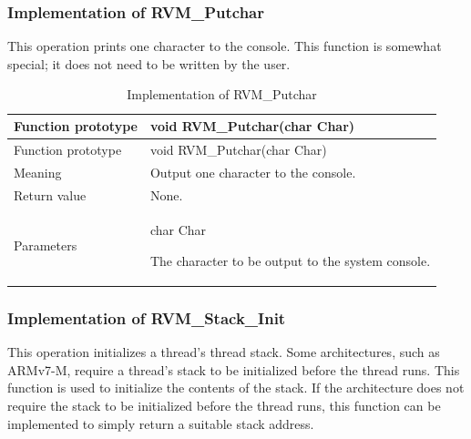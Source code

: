 \subsubsection{Implementation of RVM\_Putchar}\label{subsubsec:8-2-7-1}

This operation prints one character to the console. This function is somewhat special; it does not need to be written by the user.

\begin{xltabular}{\textwidth}{@{}>{\hsize\raggedright\arraybackslash}X>{\hsize\raggedright\arraybackslash}X@{}}
\caption{Implementation of RVM\_\allowbreak{}Putchar}\label{tab:8-14}\\
\toprule
Function prototype & void RVM\_\allowbreak{}Putchar(char Char)\tabularnewline
\endfirsthead
\toprule
Function prototype & void RVM\_\allowbreak{}Putchar(char Char)\tabularnewline
\midrule
\endhead
\bottomrule
\endlastfoot
Meaning & Output one character to the console.\tabularnewline
Return value & None.\tabularnewline
Parameters\strut
 & char Char

The character to be output to the system console.\strut
\tabularnewline
\end{xltabular}

\subsubsection{Implementation of RVM\_Stack\_Init}\label{subsubsec:8-2-7-2}

This operation initializes a thread's thread stack. Some architectures, such as ARMv7-M, require a thread's stack to be initialized before the thread runs. This function is used to initialize the contents of the stack. If the architecture does not require the stack to be initialized before the thread runs, this function can be implemented to simply return a suitable stack address.


